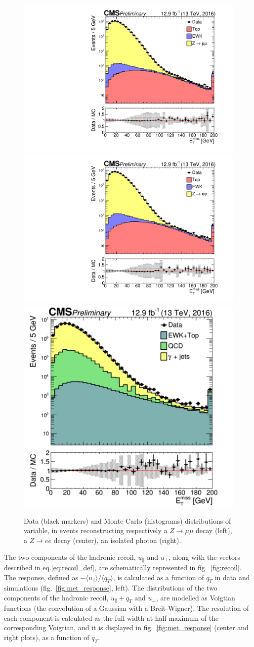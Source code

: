 \begin{figure}[!htb]
  \centering
    \includegraphics[width=.33\textwidth]{figures/MetPlots/distr_mu.pdf}%
    \includegraphics[width=.33\textwidth]{figures/MetPlots/distr_ele.pdf}%
    \includegraphics[width=.33\textwidth]{figures/MetPlots/distr_gamma.pdf}


  \caption{Data (black markers) and Monte Carlo (histograms) distributions of \MET variable, in events reconstructing respectively a $Z \rightarrow \mu \mu$ decay (left), a $Z \rightarrow e e$ decay (center), an isolated photon (right).}
  \label{fig:recoil_distribution}
\end{figure}

\noindent The two components of the hadronic recoil, $u_{\parallel}$ and $u_{\bot}$, along with the vectors described in eq.\ref{eq:recoil_def}, are schematically represented in fig.~\ref{fig:recoil}.\\
The \MET response, defined as $- \langle u_{\parallel} \rangle / \langle q_T \rangle$, is calculated as a function of $q_T$ in data and simulations (fig.~\ref{fig:met_response}, left). The distributions of the two components of the hadronic recoil, $u_{\parallel} + q_T$ and $u_{\bot}$, are modelled as Voigtian functions (the convolution of a Gaussian with a Breit-Wigner).%
 The \MET resolution of each component is calculated as the full width at half maximum of the corresponding Voigtian, and it is displayed in fig.~\ref{fig:met_response} (center and right plots), as a function of $q_T$.

